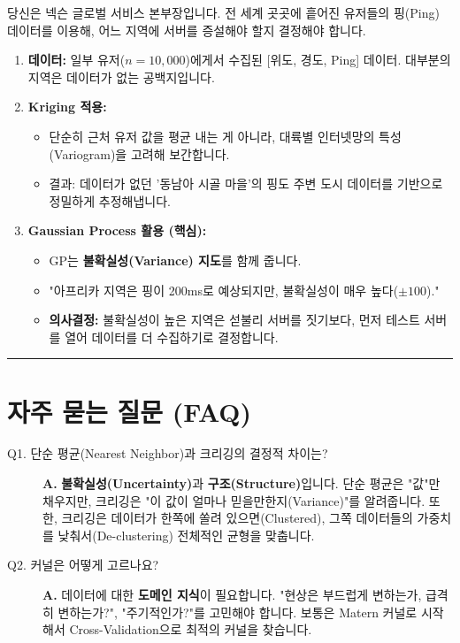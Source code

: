 \documentclass[11pt,a4paper]{book}
\theoremstyle{definition}
\begin{document}
\begin{storybox}[title={Scenario: 전 세계 유저들의 네트워크 품질 추정}]
당신은 넥슨 글로벌 서비스 본부장입니다. 전 세계 곳곳에 흩어진 유저들의 핑(Ping) 데이터를 이용해, 어느 지역에 서버를 증설해야 할지 결정해야 합니다.
\end{storybox}

\begin{enumerate}
    \item \textbf{데이터:} 일부 유저($n=10,000$)에게서 수집된 [위도, 경도, Ping] 데이터. 대부분의 지역은 데이터가 없는 공백지입니다.
    \item \textbf{Kriging 적용:}
    \begin{itemize}
        \item 단순히 근처 유저 값을 평균 내는 게 아니라, 대륙별 인터넷망의 특성(Variogram)을 고려해 보간합니다.
        \item 결과: 데이터가 없던 '동남아 시골 마을'의 핑도 주변 도시 데이터를 기반으로 정밀하게 추정해냅니다.
    \end{itemize}
    \item \textbf{Gaussian Process 활용 (핵심):}
    \begin{itemize}
        \item GP는 \textbf{불확실성(Variance) 지도}를 함께 줍니다.
        \item "아프리카 지역은 핑이 200ms로 예상되지만, 불확실성이 매우 높다($\pm 100$)."
        \item \textbf{의사결정:} 불확실성이 높은 지역은 섣불리 서버를 짓기보다, 먼저 테스트 서버를 열어 데이터를 더 수집하기로 결정합니다.
    \end{itemize}
\end{enumerate}

\vspace{0.5cm}\hrule\vspace{0.5cm}

\section{자주 묻는 질문 (FAQ)}

\begin{description}
    \item[Q1. 단순 평균(Nearest Neighbor)과 크리깅의 결정적 차이는?]
    \textbf{A.} \textbf{불확실성(Uncertainty)}과 \textbf{구조(Structure)}입니다.
    단순 평균은 "값"만 채우지만, 크리깅은 "이 값이 얼마나 믿을만한지(Variance)"를 알려줍니다. 또한, 크리깅은 데이터가 한쪽에 쏠려 있으면(Clustered), 그쪽 데이터들의 가중치를 낮춰서(De-clustering) 전체적인 균형을 맞춥니다.
    
    \item[Q2. 커널은 어떻게 고르나요?]
    \textbf{A.} 데이터에 대한 \textbf{도메인 지식}이 필요합니다. "현상은 부드럽게 변하는가, 급격히 변하는가?", "주기적인가?"를 고민해야 합니다. 보통은 Matern 커널로 시작해서 Cross-Validation으로 최적의 커널을 찾습니다.
\end{description}
\end{document}
